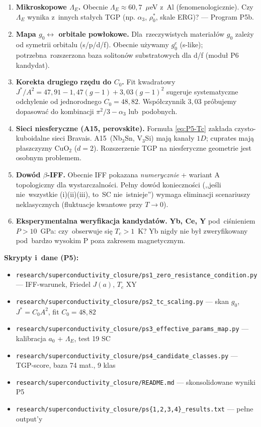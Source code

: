 \begin{enumerate}[nosep]
  \item \textbf{Mikroskopowe $\Lambda_E$.} Obecnie $\Lambda_E \approx 60{,}7$~$\mu$eV
    z~Al (fenomenologicznie). Czy~$\Lambda_E$ wynika z~innych sta\l{}ych
    TGP (np. $\alpha_3$, $\rho_0^*$, skale ERG)? --- Program P5b.
  \item \textbf{Mapa $g_0 \leftrightarrow$ orbitale pow\l{}okowe.}
    Dla~rzeczywistych materia\l{}\'ow $g_0$ zale\.zy od symetrii orbitalu
    (s/p/d/f). Obecnie u\.zywamy $g_0^e$ (s-like); potrzebna~rozszerzona
    baza soliton\'ow substratowych dla d/f (moduł P6 kandydat).
  \item \textbf{Korekta drugiego rz\k{e}du do $C_0$.} Fit kwadratowy
    $J^*/A^2 = 47{,}91 - 1{,}47(g-1) + 3{,}03(g-1)^2$ sugeruje
    systematyczne odchylenie od jednorodnego $C_0 = 48{,}82$.
    Wsp\'o\l{}czynnik $3{,}03$ pr\'obujemy dopasowa\'c do kombinacji
    $\pi^2/3 - \alpha_3$ lub~podobnych.
  \item \textbf{Sieci niesferyczne (A15, perovskite).} Formu\l{}a \eqref{eq:P5-Tc}
    zak\l{}ada czysto-kuboidalne sieci Bravais. A15~(Nb$_3$Sn, V$_3$Si) maj\k{a}
    kana\l{}y $1D$; cuprates maj\k{a} p\l{}aszczyzny CuO$_2$ ($d=2$).
    Rozszerzenie TGP na niesferyczne geometrie jest osobnym problemem.
  \item \textbf{Dow\'od $\beta$-IFF.} Obecnie IFF pokazana \emph{numerycznie}
    + wariant A topologiczny dla wystarczalno\'sci. Pe\l{}ny dow\'od
    konieczno\'sci (,,je\'sli nie~wszystkie (i)(ii)(iii), to~SC nie~istnieje'')
    wymaga eliminacji scenariuszy neklasycznych (fluktuacje kwantowe
    przy $T \to 0$).
  \item \textbf{Eksperymentalna weryfikacja kandydat\'ow.}
    \textbf{Yb, Ce, Y} pod~ci\'snieniem $P > 10$~GPa: czy~obserwuje si\k{e}
    $T_c > 1$~K? Yb nigdy nie by\l{} zweryfikowany pod~bardzo wysokim P
    poza zakresem magnetycznym.
\end{enumerate}

\medskip
\textbf{Skrypty i~dane (P5):}
\begin{itemize}[nosep]
\item \texttt{research/superconductivity\_closure/ps1\_zero\_resistance\_condition.py} --- IFF-warunek, Friedel $J(a)$, $T_c$ XY
\item \texttt{research/superconductivity\_closure/ps2\_tc\_scaling.py} --- skan $g_0$, $J^* = C_0 A^2$, fit $C_0 = 48{,}82$
\item \texttt{research/superconductivity\_closure/ps3\_effective\_params\_map.py} --- kalibracja $a_0$ + $\Lambda_E$, test 19 SC
\item \texttt{research/superconductivity\_closure/ps4\_candidate\_classes.py} --- TGP-score, baza 74 mat., 9 klas
\item \texttt{research/superconductivity\_closure/README.md} --- skonsolidowane wyniki P5
\item \texttt{research/superconductivity\_closure/ps\{1,2,3,4\}\_results.txt} --- pe\l{}ne output'y
\end{itemize}


